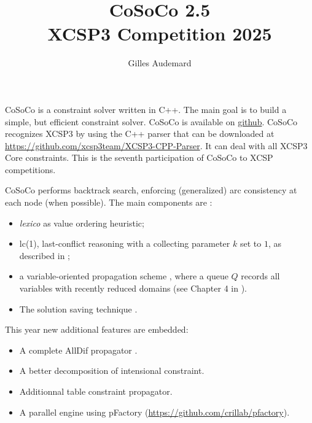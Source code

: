 \documentclass{llncs}
\newcommand{\h}[1]{\textit{#1}} %
\begin{document}
    \pagestyle{empty}


    \title{CoSoCo 2.5\\ {\small XCSP3 Competition 2025}}

    \author{Gilles Audemard}



    \maketitle




    CoSoCo is a constraint solver written in
    C++. The main goal is to build
    a simple, but efficient constraint solver. CoSoCo is available on
    \href{https://github.com/xcsp3team/cosoco}{github}. CoSoCo recognizes XCSP3
    \cite{BLPPxcsp3} by using the C++ parser that can be downloaded at
    \href{https://github.com/xcsp3team/XCSP3-CPP-Parser}{https://github.com/xcsp3team/XCSP3-CPP-Parser}. It
    can deal with all XCSP3 Core constraints.
    This is the seventh participation of CoSoCo to XCSP competitions.

    \bigskip
    CoSoCo performs backtrack search, enforcing (generalized) arc consistency at each node (when possible).
    The main components are :
    \begin{itemize}
        \item \h{lexico} as value ordering heuristic;
        \item lc(1), last-conflict reasoning with a collecting parameter $k$ set to $1$, as described in \cite{LSTV_reasonning};
        \item a variable-oriented propagation scheme \cite{G_relational}, where a queue $Q$ records all variables with recently reduced domains (see Chapter 4 in \cite{L_constraint}).
        \item The solution saving technique \cite{vion2017}.
    \end{itemize}



    This year new additional features are embedded:
    \begin{itemize}
        \item A complete AllDif propagator \cite{regin94}.
        \item A better decomposition of intensional constraint.
        \item Additionnal table constraint propagator.
        \item A parallel engine using pFactory (\url{https://github.com/crillab/pfactory}).
    \end{itemize}
\end{document}
